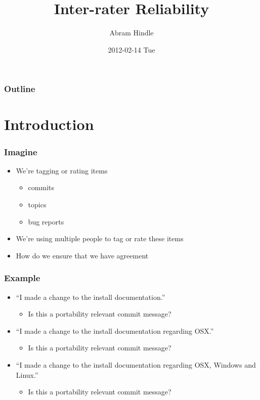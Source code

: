 \documentclass[bigger]{beamer}
\title{Inter-rater Reliability}
\author{Abram Hindle}
\date{2012-02-14 Tue}
\begin{document}
\maketitle

\begin{frame}
\frametitle{Outline}
\setcounter{tocdepth}{3}
\tableofcontents
\end{frame}




\section{Introduction}
\label{sec-1}
\begin{frame}
\frametitle{Imagine}
\label{sec-1-1}


\begin{itemize}
\item We're tagging or rating items
\begin{itemize}
\item commits
\item topics
\item bug reports
\end{itemize}
\item We're using multiple people to tag or rate these items
\item How do we ensure that we have agreement
\end{itemize}
\end{frame}
\begin{frame}
\frametitle{Example}
\label{sec-1-2}


\begin{itemize}
\item ``I made a change to the install documentation.''
\begin{itemize}
\item Is this a portability relevant commit message?
\end{itemize}
\item ``I made a change to the install documentation regarding OSX.''
\begin{itemize}
\item Is this a portability relevant commit message?
\end{itemize}
\item ``I made a change to the install documentation regarding OSX,
     Windows and Linux.''
\begin{itemize}
\item Is this a portability relevant commit message?
\end{itemize}
\end{itemize}
\end{frame}
\end{document}
